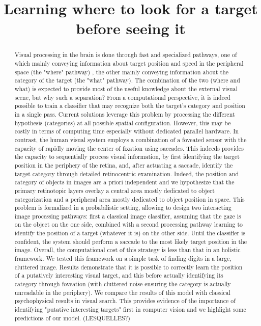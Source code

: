 \documentclass[a4]{article}
\title{
Learning where to look for a target before seeing it
}
\author{}
\begin{document}
\maketitle

\begin{abstract}
	
Visual processing in the brain is done through fast and specialized pathways, one of which mainly conveying information about target position and speed in the peripheral space (the "where" pathway) , the other mainly conveying  information about the category of the target (the "what" pathway). The combination of the two (where and what) is expected to provide most of the useful knowledge about the external visual scene, but why such a separation?
From a computational perspective, it is indeed possible to train a classifier that may recognize both the target's category and position in a single  pass. Current solutions leverage this problem by processing the different hypothesis (categories) at all possible spatial configuration. However, this may be costly in terms of computing time especially without dedicated parallel hardware.
In contrast, the human visual system employs a combination of a foveated sensor with the capacity of rapidly moving the center of fixation using saccades. This indeeds provides the capacity to sequentially process visual information, by first identifying the target position in the periphery of the retina, and, after actuating a saccade, identify the target category through detailed retinocentric examination. Indeed, the position and category of objects in images are a priori independent and we hypothesize that the primary retinotopic layers overlay a central area mostly dedicated to object categorization and a peripheral area mostly dedicated to object position in space.
This problem is formalized in a probabilistic setting, allowing to design two interacting image processing pathways: first a classical image classifier, assuming that the gaze is  on the object on the one side, combined with a second processing pathway learning to identify the position of a target (whatever it is) on the other side. Until the classifier is confident, the system should perform a saccade to the most likely target position in the image. Overall, the computational cost of this strategy is less than that in an holistic framework.
We tested this framework on a simple task of finding digits in a large, cluttered image. Results demonstrate that it is possible to correctly learn the position of a putatively interesting visual target, and this before actually identifying its category through foveation (with cluttered noise ensuring the category is actually unreadable in the periphery). We compare the results of this model with classical psychophysical results in visual search. This provides evidence of the importance of identifying "putative interesting targets" first in computer vision and we highlight some predictions of our model. (LESQUELLES?)
\end{abstract}

\newpage


\newpage



\newpage


\newpage

\end{document}
